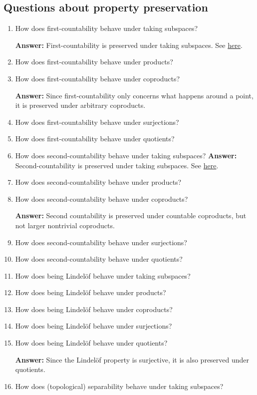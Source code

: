 \subsection{Questions about property preservation}
\begin{enumerate}
    \item How does first-countability behave under taking subspaces?

    \textbf{Answer: } First-countability is preserved under taking subspaces. See \hyperlink{FirstSecondCountabilityHereditary}{here}.
    \item How does first-countability behave under products?
    \item How does first-countability behave under coproducts?

    \textbf{Answer: } Since first-countability only concerns what happens around a point, it is preserved under arbitrary coproducts.
    \item How does first-countability behave under surjections?
    \item How does first-countability behave under quotients?
    \item How does second-countability behave under taking subspaces?
    \textbf{Answer: } Second-countability is preserved under taking subspaces. See \hyperlink{FirstSecondCountabilityHereditary}{here}.
    \item How does second-countability behave under products?
    \item How does second-countability behave under coproducts?

    \textbf{Answer: } Second countability is preserved under countable coproducts, but not larger nontrivial coproducts.
    \item How does second-countability behave under surjections?
    \item How does second-countability behave under quotients?
    \item How does being Lindel\"of behave under taking subspaces?
    \item How does being Lindel\"of behave under products?
    \item How does being Lindel\"of behave under coproducts?
    \item How does being Lindel\"of behave under surjections?
    \item How does being Lindel\"of behave under quotients?

    \textbf{Answer:} Since the Lindel\"of property is surjective, it is also preserved under quotients.
    \item How does (topological) separability behave under taking subspaces?
    

\end{enumerate}
